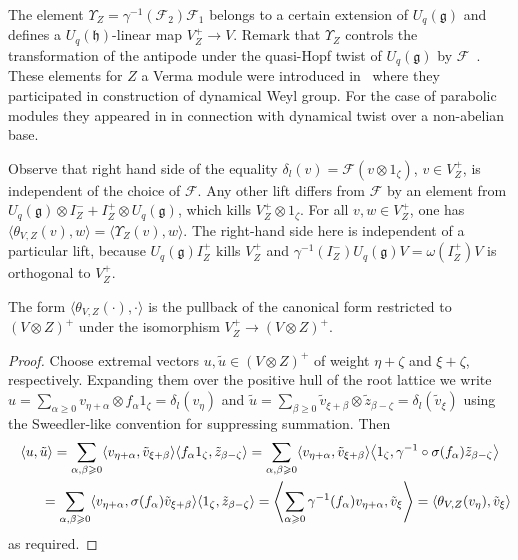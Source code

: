 The element $\Upsilon_Z = \gamma^{-1}(\mathcal{F}_2)\mathcal{F}_1$ belongs to a certain extension of $U_q(\mathfrak{g})$ and defines a $U_q(\mathfrak{h})$-linear map $V^+_Z\to V$. Remark that $\Upsilon_Z$ controls the transformation of the antipode under the quasi-Hopf twist of $U_q(\mathfrak{g})$ by $\mathcal{F}$~\cite{D1}. These elements for $Z$ a Verma module were introduced in~\cite{EV} where they participated in construction of dynamical Weyl group. For the case of parabolic modules they appeared in \cite{KM} in connection with dynamical twist over a non-abelian base.

Observe that right hand side of the equality $\delta_l(v)=\mathcal{F}(v\otimes 1_\zeta)$, $v\in V^+_Z$, is independent of the choice of $\mathcal{F}$. Any other lift differs from $\mathcal{F}$ by an element from $U_q(\mathfrak{g})\otimes I_Z^-+ I^+_Z \otimes U_q(\mathfrak{g})$, which kills $V^+_Z\otimes 1_\zeta$. For all $v,w\in V^+_Z$, one has $\langle \theta_{V,Z}(v),w\rangle=\langle \Upsilon_Z(v),w\rangle$. The right-hand side here is independent of a particular lift, because $U_q(\mathfrak{g})I^+_Z$ kills $V^+_Z$ and $\gamma^{-1}(I^-_Z)U_q(\mathfrak{g})V= \omega(I^+_Z)V$ is orthogonal to $V^+_Z$.

\begin{Proposition} The form $\langle \theta_{V,Z}(\cdot),\cdot \rangle$ is the pullback of the canonical form restricted to \linebreak $(V \otimes Z)^+$ under the isomorphism $V^+_Z\to (V\otimes Z)^+$.
\end{Proposition}
\begin{proof}Choose extremal vectors $u, \tilde u \in (V\otimes Z)^+$ of weight $\eta +\zeta$ and $\xi+\zeta$, respectively. Expanding them over the positive hull of the root lattice we write $u=\sum_{\alpha\geqslant0}v_{\eta+\alpha}\otimes f_\alpha1_\zeta =\delta_l(v_\eta)$ and $\tilde u=\sum_{\beta\geqslant0} \tilde v_{\xi+\beta}\otimes \tilde z_{\beta-\zeta}=\delta_l(\tilde v_\xi)$ using the Sweedler-like convention for suppressing summation. Then{\samepage
\begin{gather*}
\langle u, \tilde u\rangle =\sum_{\alpha,\beta\geqslant0}\langle v_{\eta+\alpha},\tilde v_{\xi+\beta}\rangle \langle f_\alpha 1_\zeta, \tilde z_{\beta-\zeta}\rangle
=\sum_{\alpha,\beta\geqslant0}\langle v_{\eta+\alpha},\tilde v_{\xi+\beta}\rangle \big\langle 1_\zeta, \gamma^{-1}\circ \sigma(f_\alpha)\tilde z_{\beta-\zeta}\big\rangle\\
\hphantom{\langle u, \tilde u\rangle}{} =\sum_{\alpha,\beta\geqslant0}\langle v_{\eta+\alpha},\sigma(f_\alpha) \tilde v_{\xi+\beta}\rangle \langle 1_\zeta, \tilde z_{\beta-\zeta}\rangle
=\left\langle \sum_{\alpha\geqslant0}\gamma^{-1}(f_\alpha) v_{\eta+\alpha},\tilde v_{\xi}\right\rangle
=\langle \theta_{V,Z}(v_{\eta}),\tilde v_{\xi}\rangle
\end{gather*}
as required.}
\end{proof}

